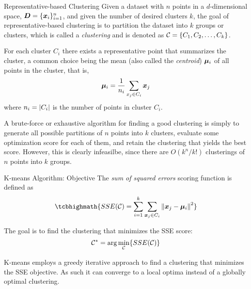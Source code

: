 
\date[Chap 13: Rep-based Clustering]{Chapter 13: Representative-based Clustering}

\begin{frame}
\titlepage
\end{frame}


\begin{frame}{Representative-based Clustering}
Given a dataset with $n$ points in a $d$-dimensional space, ${\boldsymbol D} =
\{{\boldsymbol x}_i \}_{i=1}^n$, and given the number of desired clusters $k$, the
goal of representative-based clustering is to partition the dataset into
$k$ groups or clusters, which is called a {\em clustering} and is
denoted as ${\mathcal C} = \{C_1, C_2, \ldots, C_k\}$. 

\medskip
For each cluster
$C_i$ there exists a representative point that summarizes the cluster, a
common choice being the mean (also called the {\em centroid})
${\bm \mu}_i$ of all points in
the cluster, that is,
\begin{align*}
  {\bm \mu}_i = {1\over n_i} \sum_{x_{j} \in C_i} {\boldsymbol x}_{j}
\end{align*}
where $n_i = |C_i|$ is the number of points in cluster $C_i$.

\medskip
A brute-force or exhaustive algorithm for f\/{i}nding a good clustering is simply to generate all possible partitions of $n$ points into $k$
clusters, evaluate some optimization score for each of them,
and retain the
clustering that yields the best score.
However, this is clearly infeasilbe, since there are
$O(k^n/k!)$ clusterings of $n$ points into $k$ groups. 
\end{frame}



\begin{frame}{K-means Algorithm: Objective}
The {\em sum of squared errors}
scoring function is def\/{i}ned as
\begin{align*}
\tcbhighmath{
  SSE(\cC) = \sum_{i=1}^{k}\sum_{\bx_{j} \in
  C_{i}}\norm{\bx_{j}-\bmu_i}^2
}
\end{align*}

\medskip
The goal is to f\/{i}nd the clustering that minimizes
the SSE score:
\begin{align*}
    {\mathcal C}^* = \arg \min_{{\mathcal C}} \{ SSE({\mathcal C}) \}
\end{align*}

\medskip
K-means
employs a greedy iterative approach to f\/{i}nd a clustering that minimizes
the SSE objective.
As such it can converge to a local optima
instead of a globally optimal clustering.

\end{frame}


